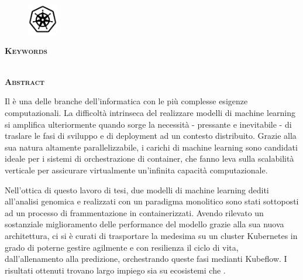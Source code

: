 % 
% 
% 

\newpage

\clearpage
\cleardoublepage
{}

\pagestyle{plain}

{}

\begin{figure}
    \centering
    \includegraphics[width=50px]{figures/logos/k8s-bw-2.png}
    \label{fig:abstract:kubernetes}
\end{figure}

\begin{center}
    \large \textbf{\thesisTitle}
\end{center}

{\noindent \textbf{\textsc{Keywords}}}

{\noindent \thesisKeywords}\\


{\noindent \textbf{\textsc{Abstract}}}

\noindent Il  è una delle branche dell'informatica con le più complesse esigenze computazionali. La difficoltà intrinseca del realizzare modelli di machine learning si amplifica ulteriormente quando sorge la necessità - pressante e inevitabile - di traslare le fasi di sviluppo e di deployment ad un contesto distribuito. Grazie alla sua natura altamente parallelizzabile, i carichi di machine learning sono candidati ideale per i sistemi di orchestrazione di container, che fanno leva sulla scalabilità verticale per assicurare virtualmente un'infinita capacità computazionale.

Nell'ottica di questo lavoro di tesi, due modelli di machine learning dediti all'analisi genomica e realizzati con un paradigma monolitico sono stati sottoposti ad un processo di frammentazione in  containerizzati. Avendo rilevato un sostanziale miglioramento delle performance del modello grazie alla sua nuova architettura, ci si è curati di trasportare la medesima su un cluster Kubernetes in grado di poterne gestire agilmente e con resilienza il ciclo di vita, dall'allenamento alla predizione, orchestrando queste fasi medianti Kubeflow. I risultati ottenuti trovano largo impiego sia su ecosistemi \textit{} che \textit{}.

